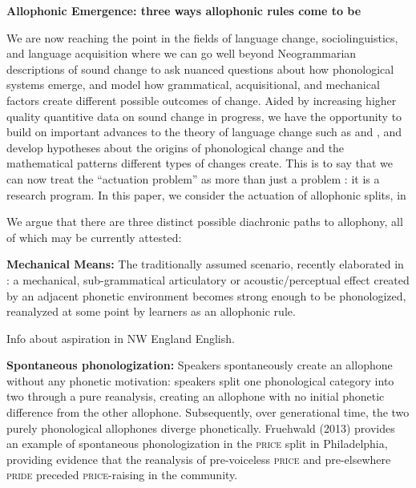 \documentclass[a4paper,aps,prl,12pt,tightenlines,superscriptaddress]{revtex4}
\title{}
\begin{document}
\begin{center} \textbf{Allophonic Emergence: three ways allophonic rules come to be} 
 \end{center}



We are now reaching the point in the fields of language change, sociolinguistics, and language acquisition where we can go well beyond Neogrammarian descriptions of sound change to ask nuanced questions about how phonological systems emerge, and model how grammatical, acquisitional, and mechanical factors create different possible outcomes of change. Aided by increasing higher quality quantitive data on sound change in progress, we have the opportunity to build on important advances to the theory of language change such as \citet{kiparsky1995b} and \citet{labov1994}, and develop hypotheses about the origins of phonological change and the mathematical patterns different types of changes create. This is to say that we can now treat the ``actuation problem'' as more than just a problem \citep{wlh1968}: it is a research program. In this paper, we consider the actuation of allophonic splits, in 

We argue that there are three distinct possible diachronic paths to allophony, all of which may be currently attested:

\textbf{Mechanical Means:} The traditionally assumed scenario, recently elaborated in \citet[][and previous work]{bermudezotero2014}: a mechanical, sub-grammatical articulatory or acoustic/perceptual effect created by an adjacent phonetic environment becomes strong enough to be phonologized, reanalyzed at some point by learners as an allophonic rule. 

Info about aspiration in NW England English. 

\textbf{Spontaneous phonologization:} Speakers spontaneously create an allophone without any phonetic motivation: speakers split one phonological category into two through a pure reanalysis, creating an allophone with no initial phonetic difference from the other allophone. Subsequently, over generational time, the two purely phonological allophones diverge phonetically. Fruehwald (2013) provides an example of spontaneous phonologization in the \textsc{price} split in Philadelphia, providing evidence that the reanalysis of pre-voiceless \textsc{price} and pre-elsewhere \textsc{pride} preceded \textsc{price}-raising in the community.
\end{document}
